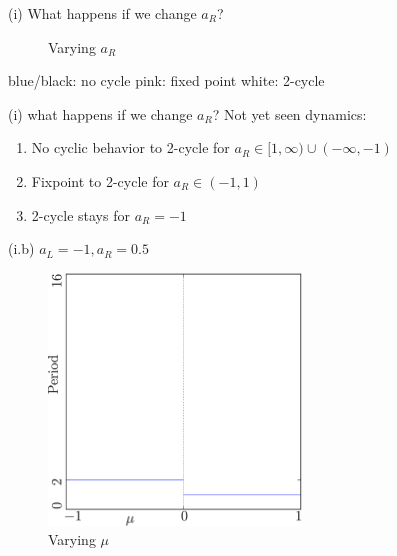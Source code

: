 \documentclass{beamer}
\newcounter{n}
\newcounter{f}
\begin{document}
\begin{frame}{(i) What happens if we change $a_R$?}
    \begin{figure}
        \centering
         \qquad
        \caption{Varying $a_R$}
    \end{figure}
    
    blue/black: no cycle
    \hspace*{\fill}
    pink: fixed point
    \hspace*{\fill}
    white: 2-cycle
\end{frame}

\begin{frame}{(i) what happens if we change $a_R$?}
    Not yet seen dynamics:
    \begin{enumerate}
        \item[(0.a)] No cyclic behavior to 2-cycle for $a_R \in [1, \infty) \cup (-\infty, -1)$
        \item[(0.b)] Fixpoint to 2-cycle for $a_R \in (-1, 1)$
        \item[(0.c)] 2-cycle stays for $a_R = -1$
    \end{enumerate}
\end{frame}

\begin{frame}{(i.b) $a_L = -1, a_R = 0.5$}
    \begin{figure}
        \centering
        \includegraphics[width=0.6\textwidth]{1D_ib/result.png}
        \caption{Varying $\mu$}
    \end{figure}
\end{frame}
\end{document}

